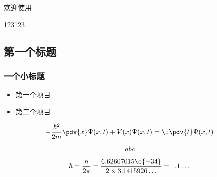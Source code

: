 
欢迎使用

123123

\subsection{第一个标题}
\subsubsection{一个小标题}

\begin{itemize}
\item 第一个项目
\item 第二个项目
\end{itemize}

\begin{equation}
-\frac{\hbar^2}{2m} \pdv{x} \Psi(x, t) + V(x) \Psi(x,t) = \I\pdv{t}\Psi(x,t)
\end{equation}

\begin{equation}
abc
\end{equation}

\begin{equation}
\hbar = \frac{h}{2\pi} = \frac{6.62607015\e{-34}}{2\times 3.1415926\dots} = 1.1\dots
\end{equation}
